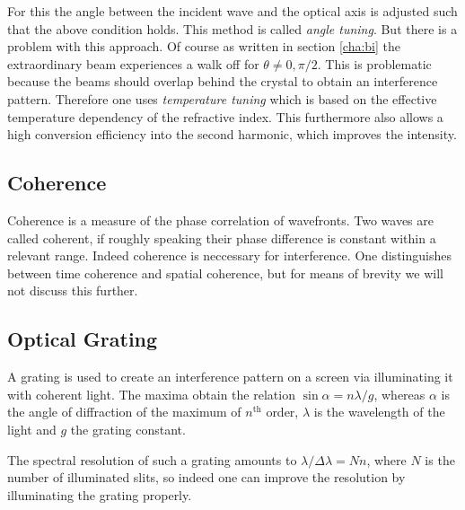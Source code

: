 \documentclass{protokoll_en}
\begin{document}
For this the angle between the incident wave and the optical axis is adjusted such that the above condition holds. This method is called \emph{angle tuning}. But there is a problem with this approach. Of course as written in section \ref{cha:bi} the extraordinary beam experiences a walk off for $\theta \neq 0, \pi/2$. This is problematic because the beams should overlap behind the crystal to obtain an interference pattern. Therefore one uses \emph{temperature tuning} which is based on the effective temperature dependency of the refractive index. This furthermore also allows a high conversion efficiency into the second harmonic, which improves the intensity.

\subsection{Coherence}
Coherence is a measure of the phase correlation of wavefronts. Two waves are called coherent, if roughly speaking their phase difference is constant within a relevant range. Indeed coherence is neccessary for interference. One distinguishes between time coherence and spatial coherence, but for means of brevity we will not discuss this further.

\subsection{Optical Grating}
A grating is used to create an interference pattern on a screen via illuminating it with coherent light. The maxima obtain the relation $\sin{\alpha} = n \lambda/g$, whereas $\alpha$ is the angle of diffraction of the maximum of $n^{\mathrm{th}}$ order, $\lambda$ is the wavelength of the light and $g$ the grating constant.

The spectral resolution of such a grating amounts to $\lambda/\Delta\lambda = N n$, where $N$ is the number of illuminated slits, so indeed one can improve the resolution by illuminating the grating properly.
\end{document}
